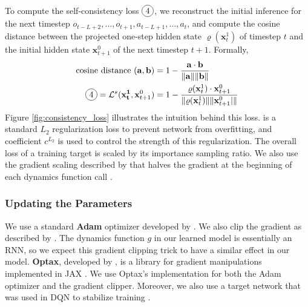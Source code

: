 To compute the self-consistency loss $\circled{4}$, we reconstruct the initial inference for the next timestep \(o_{t-L+2}, \dots, o_{t+1}, a_{t-L+1}, \dots, a_{t}\), and compute the cosine distance between the projected one-step hidden state $\varrho(\mathbf{x}^1_t)$ of timestep $t$ and the initial hidden state $\mathbf{x}^0_{t+1}$ of the next timestep $t+1$.
Formally,
\begin{align*}
    \text{cosine distance} ~ (\mathbf{a}, \mathbf{b})
                                                                     & = 1 - \frac{\mathbf{a} \cdot \mathbf{b}}{\|\mathbf{a}\|\|\mathbf{b}\|}  \\
    \circled{4} = \mathcal{L}^s(\mathbf{x^1_t}, \mathbf{x}^0_{t+1})  & = 1 - \frac{\varrho(\mathbf{x}^1_t) \cdot \mathbf{x}^0_{t+1}}{\|\varrho(\mathbf{x}^1_t)\| \| \mathbf{x}^0_{t+1}|\|}
\end{align*}
Figure \ref{fig:consistency_loss} illustrates the intuition behind this loss.
 is a standard $L_2$ regularization loss to prevent network from overfitting,
and coefficient $c^{L_2}$ is used to control the strength of this regularization.
The overall loss of a training target is scaled by its importance sampling ratio.
We also use the gradient scaling described by \citeauthor{MasteringAtariGo_Schrittwieser.Antonoglou.ea_2020}
that halves the gradient at the beginning of each dynamics function call \cite{MasteringAtariGo_Schrittwieser.Antonoglou.ea_2020}.

\subsubsection{Updating the Parameters}
We use a standard \textbf{Adam} optimizer developed by \citeauthor{AdamMethodStochastic_Kingma.Ba_2017} \cite{AdamMethodStochastic_Kingma.Ba_2017}.
We also clip the gradient as described by \citeauthor{DifficultyTrainingRecurrent_Pascanu.Mikolov.ea_} \cite{DifficultyTrainingRecurrent_Pascanu.Mikolov.ea_}.
The dynamics function $g$ in our learned model is essentially an RNN, so we expect this gradient clipping trick to have a similar effect in our model.
\textbf{Optax}, developed by \citeauthor{OptaxComposableGradient_MatteoHessel.DavidBudden.ea_2020}, is a library for gradient manipulations implemented in JAX \cite{OptaxComposableGradient_MatteoHessel.DavidBudden.ea_2020}.
We use Optax's implementation for both the Adam optimizer and the gradient clipper.
Moreover, we also use a target network that was used in DQN to stabilize training \cite{PlayingAtariDeep_Mnih.Kavukcuoglu.ea_2013}.

